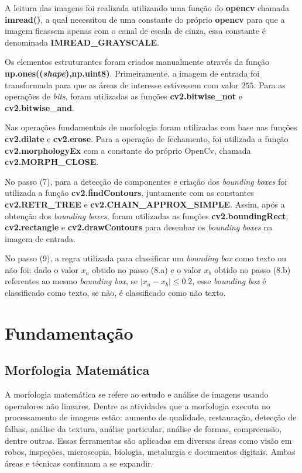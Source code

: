 \documentclass[twoside,twocolumn]{article}
\begin{document}
A leitura das imagens foi realizada utilizando uma função do \textbf{opencv} \cite{b1} chamada \textbf{imread()}, a qual necessitou de uma constante do próprio \textbf{opencv} para que a imagem ficassem apenas com o canal de escala de cinza, essa constante é denominada \textbf{IMREAD\_GRAYSCALE}.

Os elementos estruturantes foram criados manualmente através da função \textbf{np.ones((\textit{shape}),np.uint8)}. Primeiramente, a imagem de entrada foi transformada para que as áreas de interesse estivessem com valor $255$. Para as operações de \textit{bits}, foram utilizadas as funções \textbf{cv2.bitwise\_not} e \textbf{cv2.bitwise\_and}.

Nas operações fundamentais de morfologia foram utilizadas com base nas funções \textbf{cv2.dilate} e \textbf{cv2.erose}. Para a operação de fechamento, foi utilizada a função \textbf{cv2.morphologyEx} com a constante do próprio OpenCv, chamada \textbf{cv2.MORPH\_CLOSE}.

No passo (7), para a detecção de componentes e criação dos \textit{bounding boxes} foi utilizada a função \textbf{cv2.findContours}, juntamente com as constantes \textbf{cv2.RETR\_TREE} e \textbf{cv2.CHAIN\_APPROX\_SIMPLE}. Assim, após a obtenção dos \textit{bounding boxes}, foram utilizadas as funções \textbf{cv2.boundingRect}, \textbf{cv2.rectangle} e \textbf{cv2.drawContours} para desenhar os \textit{bounding boxes} na imagem de entrada.

No passo (9), a regra utilizada para classificar um \textit{bounding box} como texto ou não foi: dado o valor $x_{a}$ obtido no passo (8.a) e o valor $x_{b}$ obtido no passo (8.b) referentes ao mesmo \textit{bounding box}, se $|x_{a} - x_{b}| \leq 0.2$, esse \textit{bounding box} é classificado como texto, se não, é classificado como não texto.



\section{Fundamentação}

\subsection{Morfologia Matemática}

A morfologia matemática se refere ao estudo e análise de imagens usando operadores não lineares. Dentre as atividades que a morfologia executa no processamento de imagens estão: aumento de qualidade, restauração, detecção de falhas, análise da textura, análise particular, análise de formas, compreensão, dentre outras. Essas ferramentas são aplicadas em diversas áreas como visão em robos, inspeções, microscopia, biologia, metalurgia e documentos digitais. Ambas áreas e técnicas continuam a se expandir.
\end{document}
